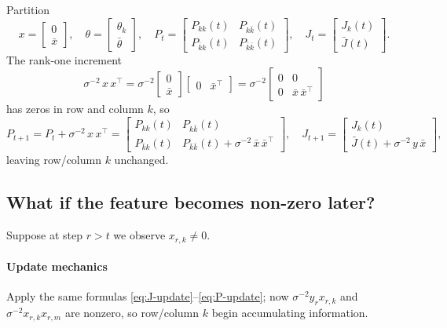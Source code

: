 \documentclass[11pt]{article}
\begin{document}
Partition
\[
x = \begin{bmatrix}0\\\bar x\end{bmatrix},\quad
\theta = \begin{bmatrix}\theta_k\\\bar\theta\end{bmatrix},\quad
P_t = \begin{bmatrix}
P_{kk}(t) & P_{k\bar k}(t)\\
P_{\bar k k}(t) & P_{\bar k\bar k}(t)
\end{bmatrix},\quad
J_t = \begin{bmatrix}J_k(t)\\\bar J(t)\end{bmatrix}.
\]
The rank-one increment
\[
\sigma^{-2}\,x\,x^\top
= \sigma^{-2}
\begin{bmatrix}0\\\bar x\end{bmatrix}
\begin{bmatrix}0 & \bar x^\top\end{bmatrix}
=
\sigma^{-2}
\begin{bmatrix}
0 & 0\\[6pt]
0 & \bar x\,\bar x^\top
\end{bmatrix}
\]
has zeros in row and column $k$, so
\[
P_{t+1}
= P_t + \sigma^{-2}\,x\,x^\top
= \begin{bmatrix}
P_{kk}(t) & P_{k\bar k}(t)\\[3pt]
P_{\bar k k}(t) & P_{\bar k\bar k}(t) + \sigma^{-2}\,\bar x\,\bar x^\top
\end{bmatrix},\quad
J_{t+1}
= \begin{bmatrix}
J_k(t)\\[3pt]
\bar J(t) + \sigma^{-2}\,y\,\bar x
\end{bmatrix},
\]
leaving row/column $k$ unchanged.

\subsection{What if the feature becomes non-zero later?}

Suppose at step $r>t$ we observe $x_{r,k}\neq0$.

\paragraph{Update mechanics}  
Apply the same formulas \eqref{eq:J-update}--\eqref{eq:P-update}; now $\sigma^{-2}y_r x_{r,k}$ and $\sigma^{-2}x_{r,k}x_{r,m}$ are nonzero, so row/column $k$ begin accumulating information.
\end{document}
